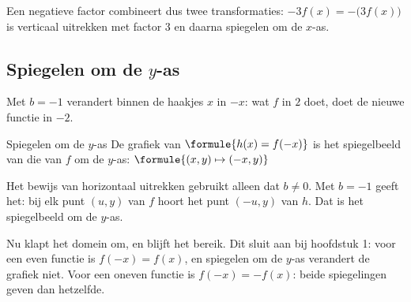 Een negatieve factor combineert dus twee transformaties: $-3f(x) = -\bigl(3f(x)\bigr)$ is verticaal uitrekken met factor $3$ en daarna spiegelen om de $x$-as.


\subsection{Spiegelen om de $y$-as}

Met $b = -1$ verandert binnen de haakjes $x$ in $-x$: wat $f$ in $2$ doet, doet de nieuwe functie in $-2$.

\begin{theorie}
\begin{stelling}{Spiegelen om de $y$-as}
De grafiek van $\formule{h(x) = f(-x)}$ is het spiegelbeeld van die van $f$ om de $y$-as: \quad $\formule{(x, y) \mapsto (-x, y)}$
\end{stelling}

\begin{bewijs}
Het bewijs van horizontaal uitrekken gebruikt alleen dat $b \neq 0$. Met $b = -1$ geeft het: bij elk punt $(u, y)$ van $f$ hoort het punt $(-u, y)$ van $h$. Dat is het spiegelbeeld om de $y$-as.
\end{bewijs}
\end{theorie}

Nu klapt het domein om, en blijft het bereik. Dit sluit aan bij hoofdstuk 1: voor een even functie is $f(-x) = f(x)$, en spiegelen om de $y$-as verandert de grafiek niet. Voor een oneven functie is $f(-x) = -f(x)$: beide spiegelingen geven dan hetzelfde.

